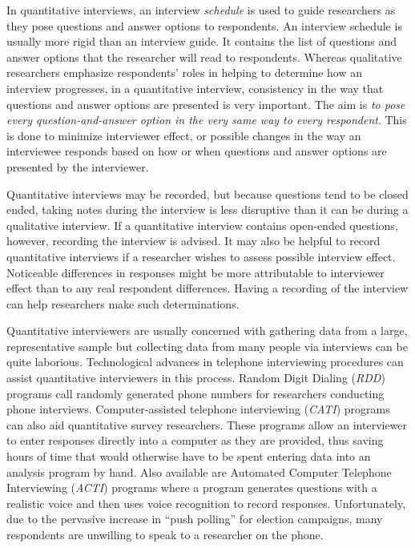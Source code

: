 In quantitative interviews, an interview \textit{schedule} is used to guide researchers as they pose questions and answer options to respondents. An interview schedule is usually more rigid than an interview guide. It contains the list of questions and answer options that the researcher will read to respondents. Whereas qualitative researchers emphasize respondents' roles in helping to determine how an interview progresses, in a quantitative interview, consistency in the way that questions and answer options are presented is very important. The aim is \textit{to pose every question-and-answer option in the very same way to every respondent}. This is done to minimize interviewer effect, or possible changes in the way an interviewee responds based on how or when questions and answer options are presented by the interviewer.

Quantitative interviews may be recorded, but because questions tend to be closed ended, taking notes during the interview is less disruptive than it can be during a qualitative interview. If a quantitative interview contains open-ended questions, however, recording the interview is advised. It may also be helpful to record quantitative interviews if a researcher wishes to assess possible interview effect. Noticeable differences in responses might be more attributable to interviewer effect than to any real respondent differences. Having a recording of the interview can help researchers make such determinations.

Quantitative interviewers are usually concerned with gathering data from a large, representative sample but collecting data from many people via interviews can be quite laborious. Technological advances in telephone interviewing procedures can assist quantitative interviewers in this process. Random Digit Dialing (\textit{RDD}) programs call randomly generated phone numbers for researchers conducting phone interviews. Computer-assisted telephone interviewing (\textit{CATI}) programs can also aid quantitative survey researchers. These programs allow an interviewer to enter responses directly into a computer as they are provided, thus saving hours of time that would otherwise have to be spent entering data into an analysis program by hand. Also available are Automated Computer Telephone Interviewing (\textit{ACTI}) programs where a program generates questions with a realistic voice and then uses voice recognition to record responses. Unfortunately, due to the pervasive increase in ``push polling'' for election campaigns, many respondents are unwilling to speak to a researcher on the phone.

